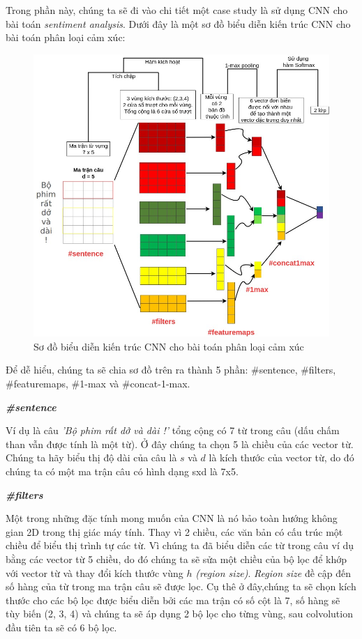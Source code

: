 Trong phần này, chúng ta sẽ đi vào chi tiết một case study là 
sử dụng CNN cho bài toán \textit{sentiment analysis}. Dưới đây là một sơ đồ biểu diễn kiến trúc CNN cho bài toán phân loại cảm xúc:

\begin{figure}[!h]
	\centering
		\includegraphics[width=1\columnwidth]{chapter05/figure/convolution-example-10.jpg}
        \caption{Sơ đồ biểu diễn kiến trúc CNN cho bài toán phân loại cảm xúc}
        \label{fig:convolutionexample10}
\end{figure}

Để dễ hiểu, chúng ta sẽ chia sơ đồ trên ra thành 5 phần: \#sentence, \#filters, \#featuremaps, \#1-max và \#concat-1-max.

\textbf{\textit{\#sentence}}

Ví dụ là câu \textit{'Bộ phim rất dở và dài !'} tổng cộng có 7 từ trong câu (dấu chấm than vẫn được tính là một từ). Ở đây chúng ta chọn 5 là chiều của các vector từ. Chúng ta hãy biểu thị độ dài của câu là $s$ và $d$ là kích thước của vector từ, do đó chúng ta có một ma trận câu có hình dạng sxd là 7x5.

\textbf{\textit{\#filters}}

Một trong những đặc tính mong muốn của CNN là nó bảo toàn hướng không gian 2D trong thị giác máy tính. Thay vì 2 chiều, các văn bản có cấu trúc một chiều để biểu thị trình tự các từ. Vì chúng ta đã biểu diễn các từ trong câu ví dụ bằng các vector từ 5 chiều, do đó chúng ta sẽ sửa một chiều của bộ lọc để khớp với vector từ và thay đổi kích thước vùng $h$ \textit{(region size)}. \textit{Region size} đề cập đến số hàng của từ trong ma trận câu sẽ được lọc. Cụ thê ở đây,chúng ta sẽ chọn kích thước cho các bộ lọc được biểu diễn bởi các ma trận có số cột là 7, số hàng sẽ tùy biến (2, 3, 4) và chúng ta sẽ áp dụng 2 bộ lọc cho từng vùng, sau colvolution đầu tiên ta sẽ có 6 bộ lọc.

